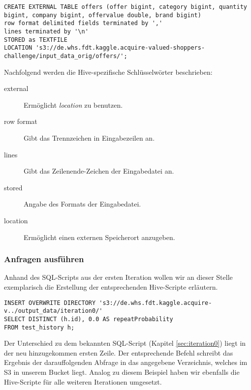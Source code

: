 \begin{lstlisting}[style=hive]
CREATE EXTERNAL TABLE offers (offer bigint, category bigint, quantity bigint, company bigint, offervalue double, brand bigint)
row format delimited fields terminated by ','
lines terminated by '\n'
STORED as TEXTFILE
LOCATION 's3://de.whs.fdt.kaggle.acquire-valued-shoppers- challenge/input_data_orig/offers/';
\end{lstlisting}

Nachfolgend werden die Hive-spezifische Schlüsselwörter beschrieben:
\begin{description}
\item[external] Ermöglicht \textit{location} zu benutzen. 
\item[row format] Gibt das Trennzeichen in Eingabezeilen an.
\item[lines] Gibt das Zeilenende-Zeichen der Eingabedatei an.
\item[stored] Angabe des Formats der Eingabedatei.
\item[location] Ermöglicht einen externen Speicherort anzugeben.
\end{description}

\subsubsection{Anfragen ausführen}
Anhand des SQL-Scripts aus der ersten Iteration wollen wir an dieser Stelle exemplarisch die Erstellung der entsprechenden Hive-Scripte erläutern.

\begin{lstlisting}[style=hive]
INSERT OVERWRITE DIRECTORY 's3://de.whs.fdt.kaggle.acquire-v../output_data/iteration0/'
SELECT DISTINCT (h.id), 0.0 AS repeatProbability
FROM test_history h;
\end{lstlisting}

Der Unterschied zu dem bekannten SQL-Script (Kapitel \ref{sec:iteration0}) liegt in der neu hinzugekommen ersten Zeile. Der entsprechende Befehl schreibt das Ergebnis der darauffolgenden Abfrage in das angegebene Verzeichnis, welches im S3 in unserem Bucket liegt. Analog zu diesem Beispiel haben wir ebenfalls die Hive-Scripte für alle weiteren Iterationen umgesetzt.

  

